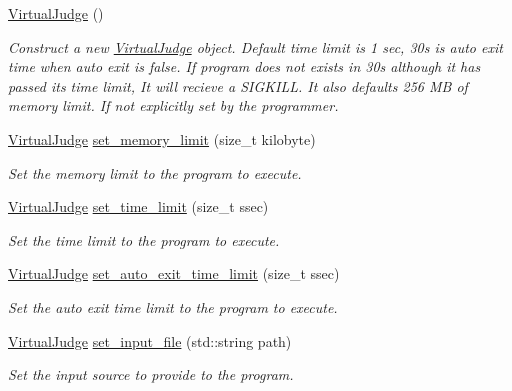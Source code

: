 \begin{DoxyCompactItemize}
\item 
\mbox{\hyperlink{classtestcaser_1_1integrator_1_1VirtualJudge_a10b68744cc523bcc8abe1ddca7a281dc}{Virtual\+Judge}} ()
\begin{DoxyCompactList}\small\item\em Construct a new \mbox{\hyperlink{classtestcaser_1_1integrator_1_1VirtualJudge}{Virtual\+Judge}} object. Default time limit is 1 sec, 30s is auto exit time when auto exit is false. If program does not exists in 30s although it has passed its time limit, It will recieve a S\+I\+G\+K\+I\+LL. It also defaults 256 MB of memory limit. If not explicitly set by the programmer. \end{DoxyCompactList}\item 
\mbox{\hyperlink{classtestcaser_1_1integrator_1_1VirtualJudge}{Virtual\+Judge}} \mbox{\hyperlink{classtestcaser_1_1integrator_1_1VirtualJudge_a8ac8e323d9f69fb4e1f6ee2e9aa1ae9f}{set\+\_\+memory\+\_\+limit}} (size\+\_\+t kilobyte)
\begin{DoxyCompactList}\small\item\em Set the memory limit to the program to execute. \end{DoxyCompactList}\item 
\mbox{\hyperlink{classtestcaser_1_1integrator_1_1VirtualJudge}{Virtual\+Judge}} \mbox{\hyperlink{classtestcaser_1_1integrator_1_1VirtualJudge_a121272932bb115881ad90be79ad7d0a7}{set\+\_\+time\+\_\+limit}} (size\+\_\+t ssec)
\begin{DoxyCompactList}\small\item\em Set the time limit to the program to execute. \end{DoxyCompactList}\item 
\mbox{\hyperlink{classtestcaser_1_1integrator_1_1VirtualJudge}{Virtual\+Judge}} \mbox{\hyperlink{classtestcaser_1_1integrator_1_1VirtualJudge_ac739270769d85fd09ae35aa53726f8f4}{set\+\_\+auto\+\_\+exit\+\_\+time\+\_\+limit}} (size\+\_\+t ssec)
\begin{DoxyCompactList}\small\item\em Set the auto exit time limit to the program to execute. \end{DoxyCompactList}\item 
\mbox{\hyperlink{classtestcaser_1_1integrator_1_1VirtualJudge}{Virtual\+Judge}} \mbox{\hyperlink{classtestcaser_1_1integrator_1_1VirtualJudge_ad982d30de1a2f9033cb042313d748292}{set\+\_\+input\+\_\+file}} (std\+::string path)
\begin{DoxyCompactList}\small\item\em Set the input source to provide to the program. \end{DoxyCompactList}\item 

\end{DoxyCompactItemize}
